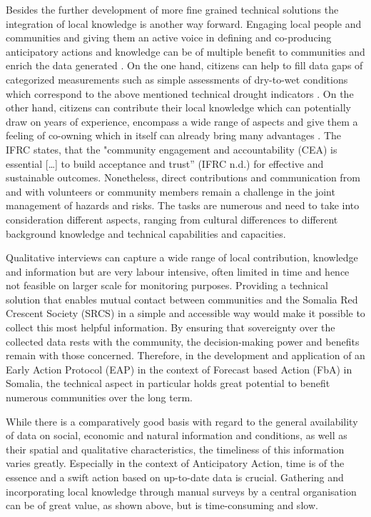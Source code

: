 Besides the further development of more fine grained technical solutions the integration of local knowledge is another way forward. Engaging local people and communities and giving them an active voice in defining and co-producing anticipatory actions and knowledge can be of multiple benefit to communities and enrich the data generated \autocite{somaliredcrescentsocietyFeasibilityStudyPotential2022, njambi-szlapkaIntegratingCommunityVoices}. On the one hand, citizens can help to fill data gaps of categorized measurements such as simple assessments of dry-to-wet conditions which correspond to the above mentioned technical drought indicators \autocite{lackstromBackyardHydroclimatologyCitizen2022}. On the other hand, citizens can contribute their local knowledge which can potentially draw on years of experience, encompass a wide range of aspects and give them a feeling of co-owning which in itself can already bring many advantages \autocite{njambi-szlapkaIntegratingCommunityVoices}. The IFRC states, that the "community engagement and accountability (CEA) is essential […] to build acceptance and trust” \autocite{ifrcCommunityEngagementAccountability}(IFRC n.d.) for effective and sustainable outcomes. 
Nonetheless, direct contributions and communication from and with volunteers or community members remain a challenge in the joint management of hazards and risks. The tasks are numerous and need to take into consideration different aspects, ranging from cultural differences to different background knowledge and technical capabilities and capacities.

Qualitative interviews can capture a wide range of local contribution, knowledge and information but are very labour intensive, often limited in time and hence not feasible on larger scale for monitoring purposes. Providing a technical solution that enables mutual contact between communities and the Somalia Red Crescent Society (SRCS) in a simple and accessible way would make it possible to collect this most helpful information. By ensuring that sovereignty over the collected data rests with the community, the decision-making power and benefits remain with those concerned. Therefore, in the development and application of an Early Action Protocol (EAP) in the context of Forecast based Action (FbA) in Somalia, the technical aspect in particular holds great potential to benefit numerous communities over the long term.

While there is a comparatively good basis with regard to the general availability of data on social, economic and natural information and conditions, as well as their spatial and qualitative characteristics, the timeliness of this information varies greatly. Especially in the context of Anticipatory Action, time is of the essence and a swift action based on up-to-date data is crucial. Gathering and incorporating local knowledge through manual surveys by a central organisation can be of great value, as shown above, but is time-consuming and slow.

